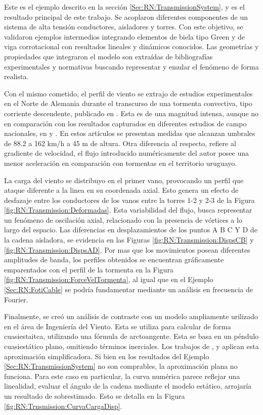  Este es el ejemplo descrito en la sección \ref{Sec:RN:TransmissionSystem}, y es el resultado principal de este trabajo. Se acoplaron diferentes componentes de un sistema de alta tensión conductores, aisladores y torres. Con este objetivo, se validaron ejemplos intermedios integrando elementos de biela tipo Green y de viga corrotacional con resultados lineales y dinámicos conocidos. Las geometrías y propiedades que integraron el modelo son extraídas de bibliografías experimentales y normativas buscando representar y emular el fenómeno de forma realista. 

 Con el mismo cometido, el perfil de viento se extrajo de estudios experimentales en el Norte de Alemania durante el transcurso de una tormenta convectiva, tipo corriente descendente, publicado en \citep{stengel2017measurements}. Esta es de una magnitud intensa, aunque no en comparación con los resultados capturados en diferentes estudios de campo nacionales, en \citep{duranona2009analysis} y \citep{duranona2019first}. En estos artículos se presentan medidas que alcanzan umbrales de 88.2 a 162 km/h a 45 m de altura. Otra diferencia al respecto, refiere al gradiente de velocidad, el flujo introducido numéricamente del autor \citeauthor{stengel2017measurements} posee una menor aceleración en comparación con tormentas en el territorio uruguayo. 
 
 La carga del viento se distribuyo en el primer vano, provocando un perfil que ataque diferente a la linea en su coordenada axial. Esto genera un efecto de desfazaje entre los conductores de los vanos entre la torres 1-2 y 2-3 de la Figura \ref{fig:RN:Transmission:Deformadas}. Esta variabilidad del flujo, busca representar un fenómeno de oscilación axial, relacionado con la presencia de vórtices a lo largo del espacio. Las diferencias en desplazamientos de los puntos A B C Y D de la cadena aisladora, se evidencia en las Figuras \ref{fig:RN:Transmission:DispsCB} y \ref{fig:RN:Transmission:DispsAD}. Por mas que los movimientos posean diferentes amplitudes de banda, los perfiles obtenidos se encuentran gráficamente emparentados con el perfil de la tormenta en la Figura \ref{fig:RN:Transmission:ForceVelTormenta}, al igual que en el Ejemplo \ref{Sec:RN:FotiCable} se podría fundamentar mediante un análisis en frecuencia de Fourier.  
 
 Finalmente, se creó un análisis de contraste con un modelo ampliamente urilizado en el área de Ingeniería del Viento. Esta se utiliza para calcular de forma cuasiestaitca, utilizando una fórmula de arctoangente. Esta se basa en un péndulo cuasiestático plano, omitiendo términos inerciales. Los trabajos de \cite{stengel2017measurements}, \cite{duranona2009analysis} y \cite{yan2009numerical} aplican esta aproximación simplificadora. Si bien en los resultados del Ejemplo \ref{Sec:RN:TransmissionSystem} no son comprables, la aproximación plana no funciona. Para este caso en particular, la curva numérica parece reflejar una linealidad, evaluar el ángulo de la cadena mediante el modelo estático, arrojaría un resultado de sobrestimado. Esto se detalla en la Figura \ref{fig:RN:Trnsmission:CurvaCargaDisp}.


